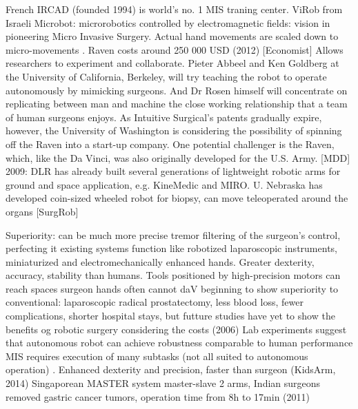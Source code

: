 French IRCAD (founded 1994) is world's no. 1 MIS traning center.
ViRob from Israeli Microbot: microrobotics controlled by electromagnetic fields: vision in pioneering Micro Invasive Surgery.
Actual hand movements are scaled down to micro-movements \citep{bib:intuitive_monopoly}.
Raven costs around 250 000 USD (2012) [Economist] Allows researchers to experiment and collaborate. Pieter Abbeel and Ken Goldberg at the University of California, Berkeley, will try teaching the robot to operate autonomously by mimicking surgeons. And Dr Rosen himself will concentrate on replicating between man and machine the close working relationship that a team of human surgeons enjoys. As Intuitive Surgical's patents gradually expire, however, the University of Washington is considering the possibility of spinning off the Raven into a start-up company.
One potential challenger is the Raven, which, like the Da Vinci, was also originally developed for the U.S. Army. [MDD]
2009: DLR has already built several generations of lightweight robotic arms for ground and space application, e.g. KineMedic and MIRO. U. Nebraska has developed coin-sized wheeled robot for biopsy, can move teleoperated around the organs [SurgRob]

Superiority:
can be much more precise
tremor filtering of the surgeon's control, perfecting it
existing systems function like robotized laparoscopic instruments, miniaturized and electromechanically enhanced hands. Greater dexterity, accuracy, stability than humans. Tools positioned by high-precision motors can reach spaces surgeon hands often cannot \citep{bib:docatadist}
daV beginning to show superiority to  conventional: laparoscopic radical prostatectomy, less blood loss, fewer complications, shorter hospital stays, but futture studies have yet to show the benefits og robotic surgery considering the costs (2006) \citep{bib:docatadist}
Lab experiments suggest that autonomous robot can achieve robustness comparable to human performance \citep{bib:raven_debride}
MIS requires execution of many subtasks (not all suited to autonomous operation) \citep{bib:raven_debride}.
Enhanced dexterity and precision, faster than surgeon (KidsArm, 2014)
Singaporean MASTER system master-slave 2 arms, Indian surgeons removed gastric cancer tumors, operation time from 8h to 17min (2011)

